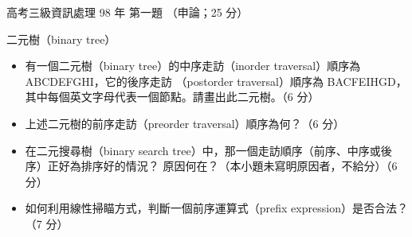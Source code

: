 \begin{pastexam}[label={px:gk3-098-ds-01}]{高考三級資訊處理 98 年 第一題}
（申論；25 分）

二元樹（binary tree）
\begin{itemize}[leftmargin=2.2em]
\item[㈠] 有一個二元樹（binary tree）的中序走訪（inorder traversal）順序為 ABCDEFGHI，它的後序走訪
（postorder traversal）順序為 BACFEIHGD，其中每個英文字母代表一個節點。請畫出此二元樹。（6 分）
\item[㈡] 上述二元樹的前序走訪（preorder traversal）順序為何？（6 分）
\item[㈢] 在二元搜尋樹（binary search tree）中，那一個走訪順序（前序、中序或後序）正好為排序好的情況？
原因何在？（本小題未寫明原因者，不給分）（6 分）
\item[㈣] 如何利用線性掃瞄方式，判斷一個前序運算式（prefix expression）是否合法？（7 分）
\end{itemize}
\end{pastexam}

